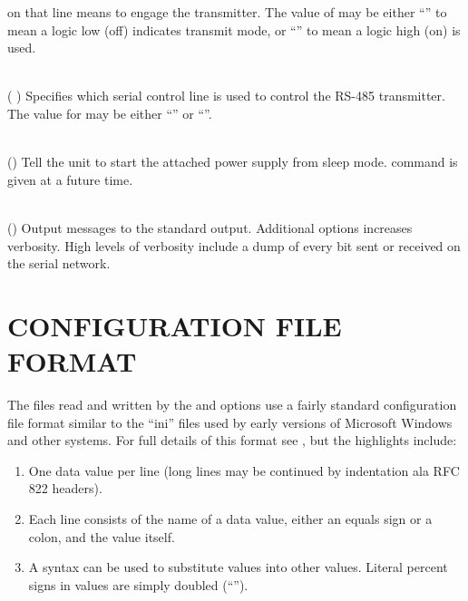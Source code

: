 \begin{list}{}{}
on that line means to engage the transmitter.  The value of
may be either 
``''
to mean a logic low (off) indicates transmit mode, or
``''
to mean a logic high (on) is used.
\item[{\codetype{----txmode=}\Var*{line}}]\hfill\\
(
)
Specifies which serial control line is used to control the RS-485 transmitter.  The
value for 
may be either
``''
or
``''.
\item[{\codetype{----wake}}]\hfill\\
()
Tell the unit to start the attached power supply from sleep mode.
command is given at a future time.
\item[{\codetype{----verbose}}]\hfill\\
()
Output messages to the standard output.  Additional 
options increases verbosity.  High levels of verbosity include a dump
of every bit sent or received on the serial network.
\end{list}
\section*{CONFIGURATION FILE FORMAT}


The files read and written by the 
and
options use a fairly standard configuration file format similar to the
``ini'' files used by early versions of Microsoft Windows and other 
systems.  For full details of this format see
,
but the highlights include:
\begin{enumerate}
\item
One data value per line (long lines may be continued by indentation ala RFC 822 headers).
\item
Each line consists of the name of a data value, either an equals sign or a colon,
and the value itself.
\item
A syntax 
\codetype{\%(}
can be used to substitute values into other values.  Literal percent signs in values
are simply doubled 
(``\codetype{\%\%}'').
\end{enumerate}


